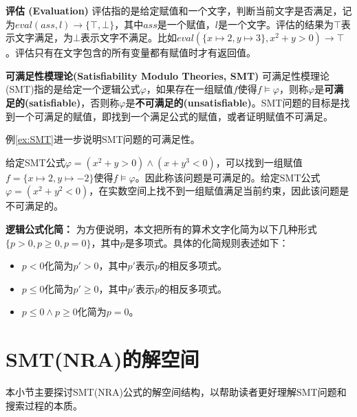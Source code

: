 \begin{definition}{\textbf{评估 (Evaluation)}}
评估指的是给定赋值和一个文字，判断当前文字是否满足，记为$eval (ass, l) \rightarrow \{\top, \bot\}$，其中$ass$是一个赋值，$l$是一个文字。评估的结果为$\top$表示文字满足，为$\bot$表示文字不满足。比如$eval (\{x \mapsto 2, y \mapsto 3\}, x^2 + y > 0) \rightarrow \top$。评估只有在文字包含的所有变量都有赋值时才有返回值。
\end{definition}

\begin{definition}{\textbf{可满足性模理论(Satisfiability Modulo Theories, SMT)}}
可满足性模理论(SMT)指的是给定一个逻辑公式$\varphi$，如果存在一组赋值$f$使得$f \models \varphi$，则称$\varphi$是\textbf{可满足的(satisfiable)}，否则称$\varphi$是\textbf{不可满足的(unsatisfiable)}。SMT问题的目标是找到一个可满足的赋值，即找到一个满足公式的赋值，或者证明赋值不可满足。
\end{definition}

例\ref{ex:SMT}进一步说明SMT问题的可满足性。

\begin{example}
\label{ex:SMT}
给定SMT公式$\varphi = (x^2 + y > 0) \wedge (x + y^3 < 0)$，可以找到一组赋值$f = \{x \mapsto 2, y \mapsto -2\}$使得$f \models \varphi$。因此称该问题是可满足的。给定SMT公式$\varphi = (x^2 + y^2 < 0)$，在实数空间上找不到一组赋值满足当前约束，因此该问题是不可满足的。
\end{example}


\textbf{逻辑公式化简：} 为方便说明，本文把所有的算术文字化简为以下几种形式$\{p > 0, p \geq 0, p = 0\}$，其中$p$是多项式。具体的化简规则表述如下：
\begin{itemize}
    \item $p < 0$化简为$p' > 0$，其中$p'$表示$p$的相反多项式。
    \item $p \leq 0$化简为$p' \geq 0$，其中$p'$表示$p$的相反多项式。
    \item $p \leq 0 \wedge p \geq 0$化简为$p = 0$。
\end{itemize}


\section{SMT(NRA)的解空间}
本小节主要探讨SMT(NRA)公式的解空间结构，以帮助读者更好理解SMT问题和搜索过程的本质。
